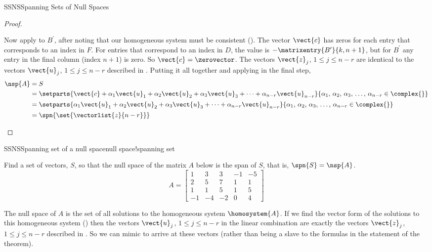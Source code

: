 \begin{subsect}{SSNS}{Spanning Sets of Null Spaces}
\begin{proof}
%
\begin{para}Now apply  to $B^{\prime}$, after noting that our homogeneous system must be consistent ().  The vector $\vect{c}$ has zeros for each entry that corresponds to an index in $F$.  For entries that correspond to an index in $D$, the value is $-\matrixentry{B^{\prime}}{k,{n+1}}$, but for $B^{\prime}$ any entry in the final column (index $n+1$) is zero.  So $\vect{c}=\zerovector$.  The vectors $\vect{z}_j$, $1\leq j\leq n-r$ are identical to the vectors $\vect{u}_j$, $1\leq j\leq n-r$ described in .  Putting it all together and applying  in the final step,
%
\begin{align*}
\nsp{A}
&=S\\
%
&=\setparts{
\vect{c}+\alpha_1\vect{u}_1+\alpha_2\vect{u}_2+\alpha_3\vect{u}_3+\cdots+\alpha_{n-r}\vect{u}_{n-r}
}{
\alpha_1,\,\alpha_2,\,\alpha_3,\,\ldots,\,\alpha_{n-r}\in\complex{\null}
}\\
%
&=\setparts{
\alpha_1\vect{u}_1+\alpha_2\vect{u}_2+\alpha_3\vect{u}_3+\cdots+\alpha_{n-r}\vect{u}_{n-r}
}{
\alpha_1,\,\alpha_2,\,\alpha_3,\,\ldots,\,\alpha_{n-r}\in\complex{\null}
}\\
%
&=\spn{\set{\vectorlist{z}{n-r}}}
%
\end{align*}
\end{para}
%
\end{proof}
%
%
\begin{example}{SSNS}{Spanning set of a null space}{null space!spanning set}
\begin{para}Find a set of vectors, $S$, so that the null space of the matrix $A$ below is the span of $S$, that is, $\spn{S}=\nsp{A}$.
%
\begin{equation*}
A=
\begin{bmatrix}
 1 & 3 & 3 & -1 & -5\\
 2 & 5 & 7 & 1 & 1\\
 1 & 1 & 5 & 1 & 5\\
 -1 & -4 & -2 & 0 & 4
\end{bmatrix}
\end{equation*}
\end{para}
%
\begin{para}The null space of $A$ is the set of all solutions to the homogeneous system $\homosystem{A}$.  If we find the vector form of the solutions to this homogeneous system () then the vectors $\vect{u}_j$, $1\leq j\leq n-r$ in the linear combination are exactly the vectors $\vect{z}_j$, $1\leq j\leq n-r$ described in .  So we can mimic  to arrive at these vectors (rather than being a slave to the formulas in the statement of the theorem).\end{para}

\end{example}
\end{subsect}
